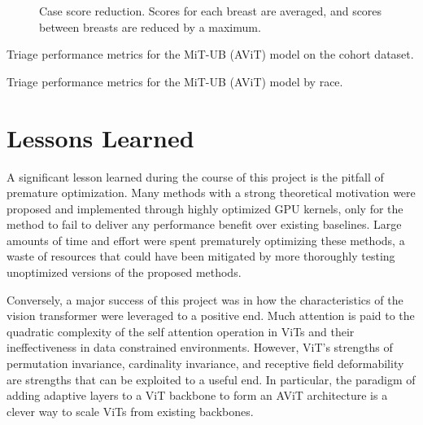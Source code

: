 \documentclass[12pt]{article}
\begin{document}
\begin{figure}[H]
    \centering
    
    \caption{Case score reduction. Scores for each breast are averaged, and scores between breasts are reduced by a maximum.}
    \label{fig:case-score}
\end{figure}

\begin{table}[H]
    \centering
    
    \caption{Triage performance metrics for the MiT-UB (AViT) model on the cohort dataset.}
    \label{tab:triage-cohort}
\end{table}


\begin{table}[H]
    \centering
    \resizebox{\textwidth}{!}{%
        
    }
    \caption{Triage performance metrics for the MiT-UB (AViT) model by race.}
    \label{tab:triage-race}
\end{table}


\section{Lessons Learned}
\noindent

A significant lesson learned during the course of this project is the pitfall of premature optimization. Many methods with a strong
theoretical motivation were proposed and implemented through highly optimized GPU kernels, only for the method to fail to deliver
any performance benefit over existing baselines. Large amounts of time and effort were spent prematurely optimizing these methods,
a waste of resources that could have been mitigated by more thoroughly testing unoptimized versions of the proposed methods.

Conversely, a major success of this project was in how the characteristics of the vision transformer were leveraged to a positive end. Much attention is paid to the quadratic complexity of the self attention operation in ViTs and their ineffectiveness in data constrained environments. However, ViT's strengths of permutation invariance, cardinality invariance, and receptive field deformability are strengths that can be exploited to a useful end. In particular, the paradigm of adding adaptive layers to a ViT backbone to form an AViT architecture is a clever way to scale ViTs from existing backbones.
\end{document}
